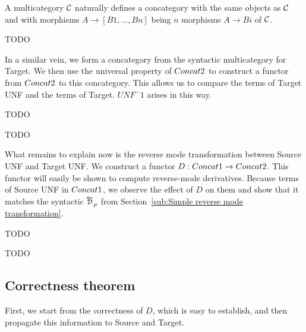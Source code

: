 \begin{definition}
    A multicategory $\mathcal{C}$ naturally defines a concategory with the same objects as $\mathcal{C}$ and
    with morphisms $A\to [B1,...,Bn]$ being $n$ morphisms $A\to Bi$ of $\mathcal{C}$. 
\end{definition}

\begin{proposition}
    TODO
\end{proposition}

In a similar vein, we form a concategory from the syntactic multicategory for Target.
We then use the universal property of $Concat2$ to construct a functor from $Concat2$ to this concategory.
This allows us to compare the terms of Target UNF and the terms of Target. 
$UNF^-1$ arises in this way.

\begin{definition}
    TODO
\end{definition}

\begin{proposition}
    TODO
\end{proposition}

What remains to explain now is the reverse mode transformation between Source UNF and Target UNF.
We construct a functor $D:Concat1\to Concat2$. 
This functor will easily be shown to compute reverse-mode derivatives.
Because terms of Source UNF in $Concat1$, we observe the effect of $D$ on them
and show that it matches the syntactic $\Dsynrevsymbol_{\rho}$ 
from Section~\ref{sub:Simple reverse mode transformation}.

\begin{definition}
    TODO
\end{definition}

\begin{proposition}
    TODO
\end{proposition}


\subsection{Correctness theorem} %
\label{sub:Correctness theorem}

First, we start from the correctness of $D$, which is easy to establish, 
and then propagate this information to Source and Target.

